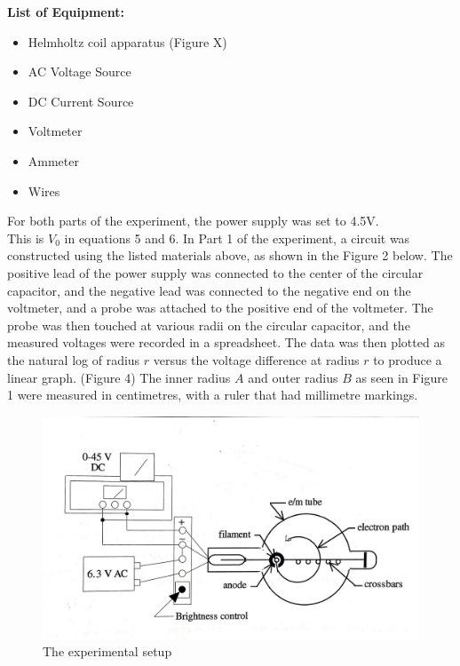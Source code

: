 \documentclass[letterpaper]{article}
\begin{document}
\textbf{List of Equipment:}
\begin{itemize}
  \item Helmholtz coil apparatus (Figure X)
  \item AC Voltage Source
  \item DC Current Source
  \item Voltmeter
  \item Ammeter
  \item Wires
\end{itemize}
For both parts of the experiment, the power supply was set to 4.5V. \\This is $V_0$ in equations 5 and 6.
\newpage
In Part 1 of the experiment, a circuit was constructed using the listed materials above, as shown in the Figure 2 below.
The positive lead of the power supply was connected to the center of the circular capacitor, and the negative lead
was connected to the negative end on the voltmeter, and a probe was attached to the positive end of the voltmeter.
The probe was then touched at various radii on the circular capacitor, and the measured voltages were recorded in
a spreadsheet. The data was then plotted as the natural log of radius $r$ versus the voltage difference at radius $r$
to produce a linear graph. (Figure 4) The inner radius $A$ and outer radius $B$ as seen in Figure 1 were measured in centimetres, with a ruler
that had millimetre markings.
\begin{figure}[H]
    \centering
    \includegraphics[width=.9\textwidth]{fig2.jpg}
    \caption{The experimental setup \cite{labmanual}}
\end{figure}
\end{document}
